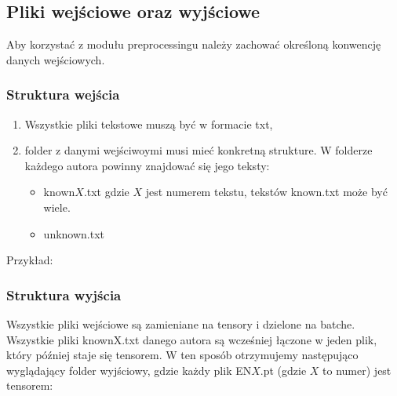 \newpage
\subsection{Pliki wejściowe oraz wyjściowe}
Aby korzystać z modułu preprocessingu należy zachować określoną konwencję danych wejściowych. 

\subsubsection{Struktura wejścia}

\begin{enumerate}
	\item Wszystkie pliki tekstowe muszą być w formacie txt,
	\item folder z danymi wejściwoymi musi mieć konkretną strukture. W folderze każdego autora
		  powinny znajdować się jego teksty: 
			\begin{itemize}
				\item known$X$.txt gdzie $X$ jest numerem tekstu, tekstów known.txt może być wiele.
				\item unknown.txt
			\end{itemize}
\end{enumerate}

Przykład: 

\myspace
{}
\myspace

\newpage
\subsubsection{Struktura wyjścia}

Wszystkie pliki wejściowe są zamieniane na tensory i dzielone na batche. Wszystkie pliki knownX.txt 
danego autora są wcześniej łączone w jeden plik, który później staje się tensorem. W ten sposób 
otrzymujemy następująco wyglądający folder wyjściowy, gdzie każdy plik EN$X$.pt (gdzie $X$ to numer)
 jest tensorem:

\myspace
{}
\myspace

